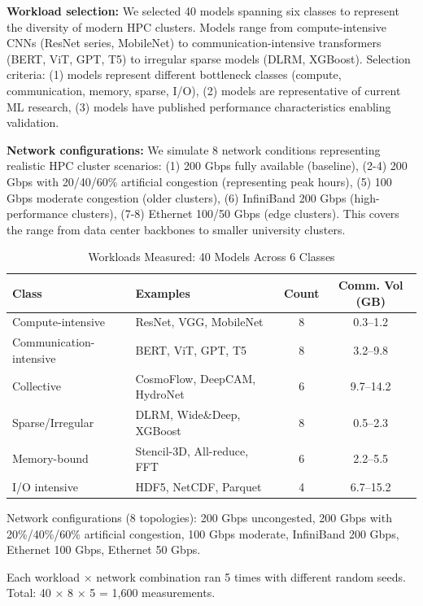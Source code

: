 \documentclass[conference]{IEEEtran}
\begin{document}
\textbf{Workload selection:} We selected 40 models spanning six classes to represent the diversity of modern HPC clusters. Models range from compute-intensive CNNs (ResNet series, MobileNet) to communication-intensive transformers (BERT, ViT, GPT, T5) to irregular sparse models (DLRM, XGBoost). Selection criteria: (1) models represent different bottleneck classes (compute, communication, memory, sparse, I/O), (2) models are representative of current ML research, (3) models have published performance characteristics enabling validation.

\textbf{Network configurations:} We simulate 8 network conditions representing realistic HPC cluster scenarios: (1) 200 Gbps fully available (baseline), (2-4) 200 Gbps with 20/40/60\% artificial congestion (representing peak hours), (5) 100 Gbps moderate congestion (older clusters), (6) InfiniBand 200 Gbps (high-performance clusters), (7-8) Ethernet 100/50 Gbps (edge clusters). This covers the range from data center backbones to smaller university clusters.

\begin{table}[t]
\centering
\caption{Workloads Measured: 40 Models Across 6 Classes}
\label{tab:workloads}
\begin{tabular}{|l|l|c|c|}
\hline
\textbf{Class} & \textbf{Examples} & \textbf{Count} & \textbf{Comm. Vol (GB)} \\
\hline
Compute-intensive & ResNet, VGG, MobileNet & 8 & 0.3--1.2 \\
Communication-intensive & BERT, ViT, GPT, T5 & 8 & 3.2--9.8 \\
Collective & CosmoFlow, DeepCAM, HydroNet & 6 & 9.7--14.2 \\
Sparse/Irregular & DLRM, Wide\&Deep, XGBoost & 8 & 0.5--2.3 \\
Memory-bound & Stencil-3D, All-reduce, FFT & 6 & 2.2--5.5 \\
I/O intensive & HDF5, NetCDF, Parquet & 4 & 6.7--15.2 \\
\hline
\end{tabular}
\end{table}

Network configurations (8 topologies): 200 Gbps uncongested, 200 Gbps with 20\%/40\%/60\% artificial congestion, 100 Gbps moderate, InfiniBand 200 Gbps, Ethernet 100 Gbps, Ethernet 50 Gbps.

Each workload × network combination ran 5 times with different random seeds. Total: 40 × 8 × 5 = 1,600 measurements.
\end{document}
